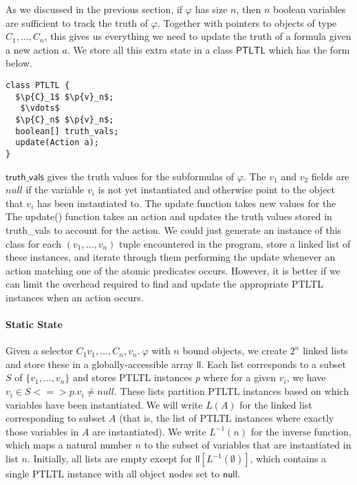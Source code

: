 \documentclass{article}
\newcommand{\ltlform}{\varphi}
\newcommand{\p}[1]{\textsf{#1}}
\begin{document}
As we discussed in the previous section, if $\ltlform$ has size $n$, then $n$ boolean variables are sufficient to track the truth of $\ltlform$.  Together with pointers to objects of type $C_1,\ldots,C_n$, this gives us everything we need to update the truth of a formula given a new action $a$.  We store all this extra state in a class $\p{PTLTL}$ which has the form below.
\pagebreak[4]
\begin{lstlisting}
class PTLTL {
  $\p{C}_1$ $\p{v}_n$;
   $\vdots$
  $\p{C}_n$ $\p{v}_n$;
  boolean[] truth_vals;
  update(Action a);
}
\end{lstlisting}

$\p{truth\_vals}$ gives the truth values for the subformulas of $\ltlform$.  
The $v_1$ and $v_2$ fields are $null$ if the variable $v_i$ is not yet instantiated and otherwise point to the object that $v_i$ has been instantiated to.
The \p{update} function takes new values for the 
The \p{update()} function takes an action and updates the truth values stored in \p{truth\_vals} to account for the action.
We could just generate an instance of this class for each $(v_1,\ldots,v_n)$ tuple encountered in the program, store a linked list of these instances, and iterate through them performing the update whenever an action matching one of the atomic predicates occurs.  However, it is better if we can limit the overhead required to find and update the appropriate \p{PTLTL} instances when an action occurs.

\paragraph{Static State}
\newcommand{\Linv}{L^{-1}}
\newcommand{\llist}{\p{ll}}
Given a selector $C_1 v_1, \ldots, C_n, v_n.\ \ltlform$ with $n$ bound objects, we create $2^n$ linked lists and store these in a globally-accessible array $\llist$.  Each list corresponds to a subset $S$ of $\{v_1,\ldots,v_n\}$ and stores PTLTL instances $p$ where for a given $v_i$, we have $v_i \in S <=> p.v_i \neq null$.  These lists partition PTLTL instances based on which variables have been instantiated.   We will write $L(A)$ for the linked list corresponding to subset $A$ (that is, the list of \p{PTLTL} instances where exactly those variables in $A$ are instantiated).  We write $\Linv(n)$ for the inverse function, which maps a natural number $n$ to the subset of variables that are instantiated in list $n$.  Initially, all lists are empty except for $\llist[\Linv(\emptyset)]$, which contains a single \p{PTLTL} instance with all object nodes set to $\p{null}$.
\end{document}
